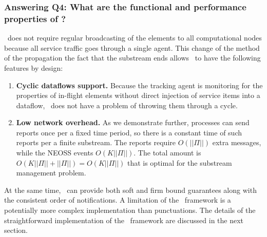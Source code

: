 \subsubsection{Answering Q4: What are the functional and performance properties of \tracker?}

\tracker\ does not require regular broadcasting of the elements to all computational nodes because all service traffic goes through a single agent. This change of the method of the propagation the fact that the substream ends allows \tracker\ to have the following features by design:

\begin{enumerate}
    \item {\bf Cyclic dataflows support.} Because the tracking agent is monitoring for the properties of in-flight elements without direct injection of service items into a dataflow, \tracker\ does not have a problem of throwing them through a cycle.
    \item {\bf Low network overhead.} As we demonstrate further, processes can send reports once per a fixed time period, so there is a constant time of such reports per a finite substream. The reports require $O(||\Pi||)$ extra messages, while the NEOSS events $O(K||\Pi||)$. The total amount is $O(K||\Pi|| + ||\Pi||) = O(K||\Pi||)$ that is optimal for the substream management problem. 
\end{enumerate}

At the same time, \tracker\ can provide both soft and firm bound guarantees along with the consistent order of notifications. A limitation of the \tracker\ framework is a potentially more complex implementation than punctuations. The details of the straightforward implementation of the \tracker\ framework are discussed in the next section.
